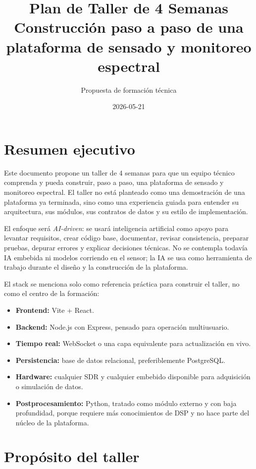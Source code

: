 \documentclass[11pt,a4paper]{article}
\title{\textbf{Plan de Taller de 4 Semanas}\\
\large Construcción paso a paso de una plataforma de sensado y monitoreo espectral}
\author{Propuesta de formación técnica}
\date{2026-05-21}
\newcommand{\aidriven}{\textit{AI-driven}}
\begin{document}
\maketitle

\section*{Resumen ejecutivo}

Este documento propone un taller de 4 semanas para que un equipo técnico comprenda y pueda construir, paso a paso, una plataforma de sensado y monitoreo espectral. El taller no está planteado como una demostración de una plataforma ya terminada, sino como una experiencia guiada para entender su arquitectura, sus módulos, sus contratos de datos y su estilo de implementación.

El enfoque será \aidriven: se usará inteligencia artificial como apoyo para levantar requisitos, crear código base, documentar, revisar consistencia, preparar pruebas, depurar errores y explicar decisiones técnicas. No se contempla todavía IA embebida ni modelos corriendo en el sensor; la IA se usa como herramienta de trabajo durante el diseño y la construcción de la plataforma.

El stack se menciona solo como referencia práctica para construir el taller, no como el centro de la formación:

\begin{itemize}
  \item \textbf{Frontend:} Vite + React.
  \item \textbf{Backend:} Node.js con Express, pensado para operación multiusuario.
  \item \textbf{Tiempo real:} WebSocket o una capa equivalente para actualización en vivo.
  \item \textbf{Persistencia:} base de datos relacional, preferiblemente PostgreSQL.
  \item \textbf{Hardware:} cualquier SDR y cualquier embebido disponible para adquisición o simulación de datos.
  \item \textbf{Postprocesamiento:} Python, tratado como módulo externo y con baja profundidad, porque requiere más conocimientos de DSP y no hace parte del núcleo de la plataforma.
\end{itemize}

\section*{Propósito del taller}
\end{document}
